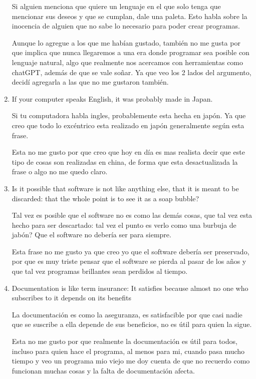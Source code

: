 \documentclass{article}
\begin{document}
\begin{enumerate}
    Si alguien menciona que quiere un lenguaje en el que solo tenga que mencionar sus deseos y que se cumplan, dale una paleta. Esto habla sobre la inocencia de alguien que no sabe lo necesario para poder crear programas.

    Aunque lo agregue a los que me habían gustado, también no me gusta por que implica que nunca llegaremos a una era donde programar sea posible con lenguaje natural, algo que realmente nos acercamos con herramientas como chatGPT, además de que se vale soñar. Ya que veo los 2 lados del argumento, decidí agregarla a las que no me gustaron también.
    
    \item If your computer speaks English, it was probably made in Japan.

    Si tu computadora habla ingles, probablemente esta hecha en japón. Ya que creo que todo lo excéntrico esta realizado en japón generalmente según esta frase.

    Esta no me gusto por que creo que hoy en día es mas realista decir que este tipo de cosas son realizadas en china, de forma que esta desactualizada la frase o algo no me quedo claro.
    
    \item Is it possible that software is not like anything else, that it is meant to be discarded: that the whole point is to see it as a soap bubble?

    Tal vez es posible que el software no es como las demás cosas, que tal vez esta hecho para ser descartado: tal vez el punto es verlo como una burbuja de jabón? Que el software no debería ser para siempre.

    Esta frase no me gusto ya que creo yo que el software debería ser preservado, por que es muy triste pensar que el software se pierda al pasar de los años y que tal vez programas brillantes sean perdidos al tiempo.
    
    \item Documentation is like term insurance: It satisfies because almost no one who subscribes to it depends on its benefits

    La documentación es como la aseguranza, es satisfacible por que casi nadie que se suscribe a ella depende de sus beneficios, no es útil para quien la sigue.

    Esta no me gusto por que realmente la documentación es útil para todos, incluso para quien hace el programa, al menos para mi, cuando pasa mucho tiempo y veo un programa mio viejo me doy cuenta de que no recuerdo como funcionan muchas cosas y la falta de documentación afecta.
    

\end{enumerate}
\end{document}
